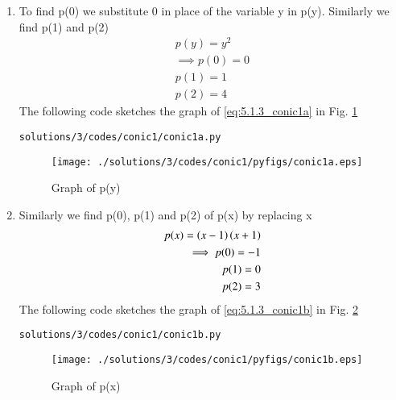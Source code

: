 \begin{enumerate}

\item  To find p(0) we substitute 0 in place of the variable y in p(y). Similarly we find p(1) and p(2)
\begin{align}
\label{eq:5.1.3_conic1a}
 p(y) = y^{2}
\\
\implies p(0) =0
\\
p(1) = 1
\\
p(2) = 4
\end{align}
The following code sketches the graph of \ref{eq:5.1.3_conic1a} in Fig. \ref{fig:5.1.3_conic1a}
\begin{lstlisting}
solutions/3/codes/conic1/conic1a.py
\end{lstlisting}
\begin{figure}[!ht]
\centering
\texttt{[image: ./solutions/3/codes/conic1/pyfigs/conic1a.eps]}
\caption{Graph of p(y)}
\label{fig:5.1.3_conic1a}
\end{figure}


\item Similarly we find p(0), p(1) and p(2) of p(x) by replacing x
\begin{align}
\label{eq:5.1.3_conic1b}
 p(x) = \left(x-1\right)\left(x+1\right)
\\
\implies p(0) =-1
\\
p(1) = 0
\\
p(2) = 3
\end{align}
The following code sketches the graph of \ref{eq:5.1.3_conic1b} in Fig. \ref{fig:5.1.3_conic1b}
\begin{lstlisting}
solutions/3/codes/conic1/conic1b.py
\end{lstlisting}
\begin{figure}[!ht]
\centering
\texttt{[image: ./solutions/3/codes/conic1/pyfigs/conic1b.eps]}
\caption{Graph of p(x)}
\label{fig:5.1.3_conic1b}
\end{figure}

\end{enumerate}
